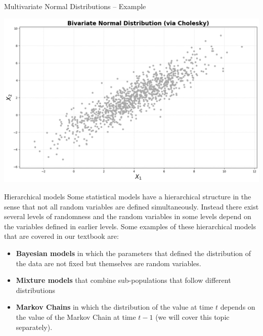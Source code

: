 \documentclass[8pt]{beamer}
\begin{document}
\begin{frame}{Multivariate Normal Distributions -- Example}
\begin{center}
\includegraphics[width=\textwidth]{chapter2-part1-plot1.png}
\end{center}
\end{frame}


\begin{frame}{Hierarchical models}
Some statistical models have a hierarchical structure in the sense that not all random variables are defined simultaneously. Instead there exist several levels of randomness and the random variables in some levels depend on the variables defined in earlier levels. Some examples of these hierarchical models that are covered in our textbook are:

\vspace{2mm}

\begin{itemize}
	\item \textbf{Bayesian models} in which the parameters that defined the distribution of the data are not fixed but themselves are random variables.
	\item \textbf{Mixture models} that combine sub-populations that follow different distributions
	\item \textbf{Markov Chains} in which the distribution of the value at time $t$ depends on the value of the Markov Chain at time $t-1$ (we will cover this topic separately).
\end{itemize}
\end{frame}
\end{document}
